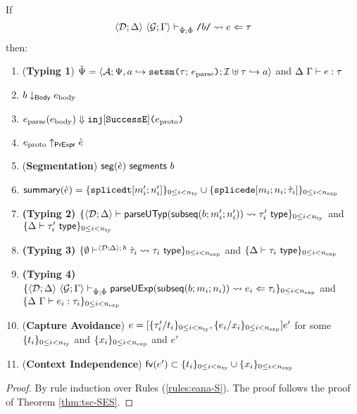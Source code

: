 \begin{theorem}
\label{thm:tsc-B}
If \[\langle \mathcal{D}; \Delta \rangle~\langle \mathcal{G}; \Gamma \rangle \vdash_{\hat{\Psi}; \hat\Phi} {\texttt{/}b\texttt{/}} \leadsto e \Leftarrow \tau\] then:
\begin{enumerate}
\item (\textbf{Typing 1}) $\hat{\Psi} = \langle \mathcal{A}; \Psi, a \hookrightarrow \texttt{setsm}\texttt{(}\tau;\,e_\text{parse}\texttt{)}; \mathcal{I} \uplus \tau \hookrightarrow a \rangle$ and $\Delta~\Gamma \vdash e : \tau$
\item $b \downarrow_\mathsf{Body} e_\text{body}$
\item $e_\text{parse}(e_\text{body}) \Downarrow \texttt{inj}[\mathtt{SuccessE}]\texttt{(}e_\text{proto}\texttt{)}$
\item $e_\text{proto} \uparrow_\mathsf{PrExpr} \grave{e}$
\item (\textbf{Segmentation}) $\mathsf{seg}(\grave{e})~\mathsf{segments}~b$
\item $\mathsf{summary}(\grave{e}) = \{\texttt{splicedt}[m'_i; n'_i]\}_{0 \leq i < n_\text{ty}} \cup \{\texttt{splicede}[m_i; n_i; \grave{\tau}_i]\}_{0 \leq i < n_\text{exp}}$
\item \textbf{(Typing 2)} $\{
      \langle \mathcal{D}; \Delta \rangle \vdash 
        \mathsf{parseUTyp}(\mathsf{subseq}(b; m'_i; n'_i))
       \leadsto \tau'_i~\mathsf{type}
    \}_{0 \leq i < n_\text{ty}}$ and $\{\Delta \vdash \tau'_i~\mathsf{type}\}_{0 \leq i < n_\text{ty}}$
\item \textbf{(Typing 3)} $\{
  \emptyset\vdash^{
    \langle \mathcal{D}; \Delta \rangle
      ;\,b
  } 
    \grave{\tau}_i
   \leadsto \tau_i~\mathsf{type}
\}_{0 \leq i < n_\text{exp}}$ and $\{\Delta \vdash \tau_i~\mathsf{type}\}_{0 \leq i < n_\text{exp}}$
\item \textbf{(Typing 4)} $\{
  \langle \mathcal{D}; \Delta \rangle~\langle \mathcal{G}; \Gamma \rangle \vdash_{\hat{\Psi}; \hat\Phi} \mathsf{parseUExp}(\mathsf{subseq}(b; m_i; n_i)) \leadsto e_i \Leftarrow \tau_i
\}_{0 \leq i < n_\text{exp}}$ and $\{\Delta~\Gamma \vdash e_i : \tau_i\}_{0 \leq i < n_\text{exp}}$
\item (\textbf{Capture Avoidance}) $e = [\{\tau'_i/t_i\}_{0 \leq i < n_\text{ty}}, \{e_i/x_i\}_{0 \leq i < n_\text{exp}}]e'$ for some $\{t_i\}_{0 \leq i < n_\text{ty}}$ and $\{x_i\}_{0 \leq i < n_\text{exp}}$ and $e'$
\item (\textbf{Context Independence}) $\mathsf{fv}(e') \subset \{t_i\}_{0 \leq i < n_\text{ty}} \cup \{x_i\}_{0 \leq i < n_\text{exp}}$
\end{enumerate}
\end{theorem}
\begin{proof} By rule induction over Rules (\ref{rules:eana-S}). The proof follows the proof of Theorem \ref{thm:tsc-SES}. 
\end{proof}



